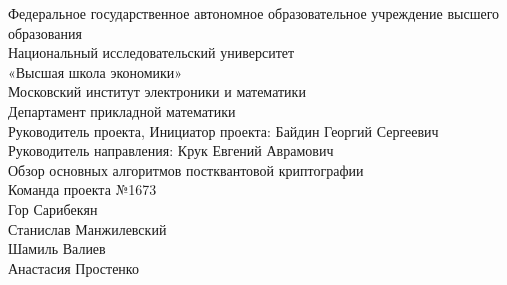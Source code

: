 \begin{titlepage}
\begin{center}
Федеральное государственное автономное образовательное учреждение высшего образования
\\
Национальный исследовательский университет\\
«Высшая школа экономики»\\
Московский институт электроники и математики\\
Департамент прикладной математики\\
Руководитель проекта, Инициатор проекта: Байдин Георгий Сергеевич\\
Руководитель направления: Крук Евгений Аврамович\\
\vspace{24pt}
\huge Обзор основных алгоритмов постквантовой криптографии\\
\vspace{96pt}
\large Команда проекта №1673 \\
Гор Сарибекян\\
Станислав Манжилевский\\
Шамиль Валиев\\
Анастасия Простенко\\
\vspace{12pt}
\end{center}
\end{titlepage}

